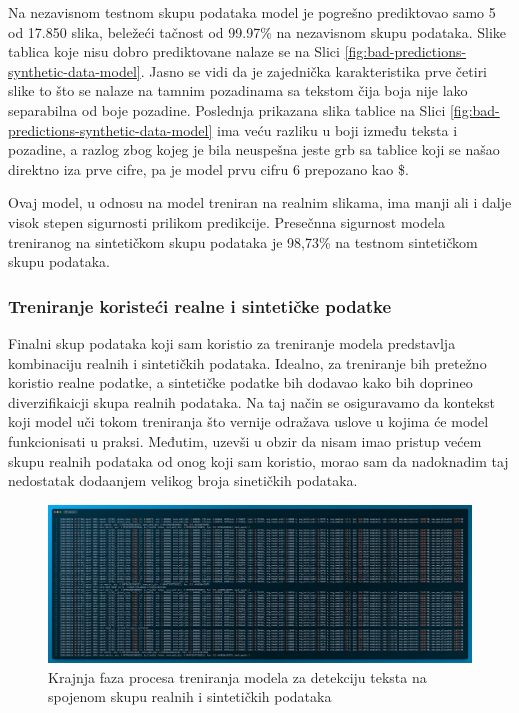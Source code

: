 \documentclass[a4paper,12pt]{article}
\begin{document}
	Na nezavisnom testnom skupu podataka model je pogrešno prediktovao samo 5 od 17.850 slika, beležeći tačnost od 99.97\% na nezavisnom skupu podataka. Slike tablica koje nisu dobro prediktovane nalaze se na Slici \ref{fig:bad-predictions-synthetic-data-model}. Jasno se vidi da je zajednička karakteristika prve četiri slike to što se nalaze na tamnim pozadinama sa tekstom čija boja nije lako separabilna od boje pozadine. Poslednja prikazana slika tablice na Slici \ref{fig:bad-predictions-synthetic-data-model} ima veću razliku u boji između teksta i pozadine, a razlog zbog kojeg je bila neuspešna jeste grb sa tablice koji se našao direktno iza prve cifre, pa je model prvu cifru 6 prepozano kao \$.
	
	Ovaj model, u odnosu na model treniran na realnim slikama, ima manji ali i dalje visok stepen sigurnosti prilikom predikcije. Presečnna sigurnost modela treniranog na sintetičkom skupu podataka je 98,73\% na testnom sintetičkom skupu podataka.
	
	\subsubsection{Treniranje koristeći realne i sintetičke podatke}
	Finalni skup podataka koji sam koristio za treniranje modela predstavlja kombinaciju realnih i sintetičkih podataka. Idealno, za treniranje bih pretežno koristio realne podatke, a sintetičke podatke bih dodavao kako bih doprineo diverzifikaicji skupa realnih podataka. Na taj način se osiguravamo da kontekst koji model uči tokom treniranja što vernije odražava uslove u kojima će model funkcionisati u praksi. Međutim, uzevši u obzir da nisam imao pristup većem skupu realnih podataka od onog koji sam koristio, morao sam da nadoknadim taj nedostatak dodaanjem velikog broja sinetičkih podataka.
	
	\begin{figure}[H]
		\centering
		\includegraphics[width=\textwidth]{assets/train-code-real-and-synthetic-data.png}
		\caption{Krajnja faza procesa treniranja modela za detekciju teksta na spojenom skupu realnih i sintetičkih podataka}
		\label{fig:train-code-real-and-synthetic-data}
	\end{figure}
\end{document}
